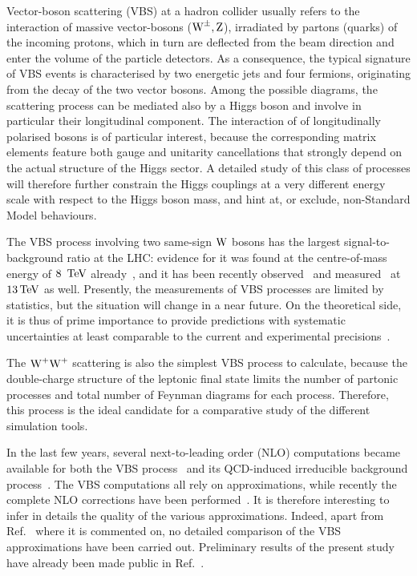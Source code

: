 Vector-boson scattering (VBS) at a hadron collider 
usually refers to the interaction of massive vector-bosons ($\text{W}^\pm,\text{Z}$),
irradiated by partons (quarks) of the incoming protons, 
which in turn are deflected from the beam direction 
and enter the volume of the particle detectors.
As a consequence, the typical signature of VBS events
is characterised by two energetic jets 
and four fermions,
originating from the decay of the two vector bosons.
Among the possible diagrams,
the scattering process can be mediated also by a Higgs boson
and involve in particular their longitudinal component.
The interaction of of longitudinally polarised bosons is of particular interest, 
because the corresponding matrix elements feature both gauge and unitarity cancellations 
that strongly depend on the actual structure of the Higgs sector.
A detailed study of this class of processes will therefore further constrain the Higgs couplings 
at a very different energy scale with respect to the Higgs boson mass,
and hint at, or exclude, non-Standard Model behaviours.

The VBS process involving two same-sign $\text{W}$ bosons has the largest signal-to-background ratio at the LHC:
evidence for it was found at the centre-of-mass energy of $8~\,\text{TeV}$ already~\cite{Aad:2014zda,Khachatryan:2014sta},
and it has been recently observed~\cite{Sirunyan:2017ret} and measured~\cite{Aaboud:2016ffv} 
at $13\,\text{TeV}$ as well.
Presently, the measurements of VBS processes are limited by statistics, but the situation will change in a near future.
On the theoretical side, 
it is thus of prime importance to provide predictions with systematic uncertainties
at least comparable to the current and experimental precisions~\cite{CMS:2016rcn}.


The $\text{W}^+\text{W}^+$ scattering is also the simplest VBS process to calculate, 
because the double-charge structure of the leptonic final state 
limits the number of partonic processes and total number of Feynman diagrams for each process.
Therefore, this process is the ideal candidate for a comparative study of the different simulation tools.

In the last few years, several next-to-leading order (NLO) computations became available for both the VBS process~\cite{Jager:2006zc,Jager:2006cp,Bozzi:2007ur,Jager:2009xx,Jager:2011ms,Denner:2012dz,Rauch:2016pai} and its QCD-induced irreducible background process~\cite{Rauch:2016pai,Melia:2010bm,Melia:2011gk,Campanario:2013gea,Baglio:2014uba}.
The VBS computations all rely on approximations, while recently the complete NLO corrections have been performed~\cite{Biedermann:2017bss}.
It is therefore interesting to infer in details the quality of the various approximations.
Indeed, apart from Ref.~\cite{Biedermann:2017bss} where it is commented on,  no detailed comparison of the VBS approximations have been carried out.
Preliminary results of the present study have already been made public in Ref.~\cite{Anders:2018gfr}.

